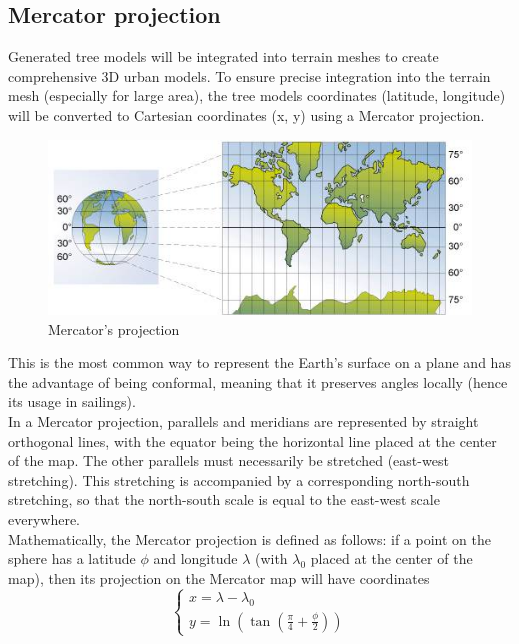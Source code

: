 \documentclass[12pt]{article}
\begin{document}
\subsection{Mercator projection}

Generated tree models will be integrated into terrain meshes to create comprehensive
3D urban models. To ensure precise integration into the terrain mesh (especially for large area), the tree models coordinates
(latitude, longitude) will be converted to Cartesian coordinates (x, y) using
a Mercator projection\cite{mercator-proj}.

\begin{figure}[H]
    \centering
    \includegraphics[width=1\textwidth]{images/mercator.jpg}
    \caption{Mercator's projection\cite{img:mercator}}
\end{figure}

This is the most common way to represent the Earth's surface on a plane and has
the advantage of being conformal, meaning that it preserves angles locally (hence
 its usage in sailings). \\
 In a Mercator projection, parallels and meridians are represented by straight
 orthogonal lines, with the equator being the horizontal line placed at the center
  of the map. The other parallels must necessarily be stretched (east-west
  stretching). This stretching is accompanied by a corresponding north-south
  stretching, so that the north-south scale is equal to the east-west scale
  everywhere. \\
  Mathematically, the Mercator projection is defined as follows: if a point on
  the sphere has a latitude $\phi$ and longitude $\lambda$ (with $\lambda_{0}$
  placed at the center of the map), then its projection on the Mercator map will
  have coordinates
  \begin{equation}
    \left\{
    \begin{array}{l}
        x =  \lambda - \lambda_{0} \\
        y =  \ln(\tan(\frac{\pi}{4} + \frac{\phi}{2}))
    \end{array}
    \right.
\end{equation}
\end{document}
